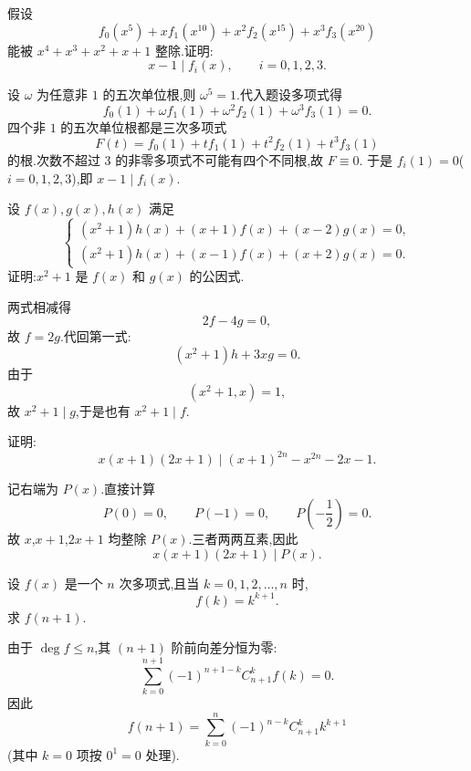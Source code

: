 \begin{example}
假设
\[
  f_0(x^5)+xf_1(x^{10})+x^2f_2(x^{15})+x^3f_3(x^{20})
\]
能被 $x^4+x^3+x^2+x+1$ 整除.证明:
\[
  x-1\mid f_i(x),
  \qquad i=0,1,2,3.
\]
\end{example}
\exampleblank

\begin{solution}
设 $\omega$ 为任意非 $1$ 的五次单位根,则 $\omega^5=1$.代入题设多项式得
\[
  f_0(1)+\omega f_1(1)+\omega^2f_2(1)+\omega^3f_3(1)=0.
\]
四个非 $1$ 的五次单位根都是三次多项式
\[
  F(t)=f_0(1)+t f_1(1)+t^2f_2(1)+t^3f_3(1)
\]
的根.次数不超过 $3$ 的非零多项式不可能有四个不同根,故 $F\equiv0$.
于是 $f_i(1)=0$($i=0,1,2,3$),即 $x-1\mid f_i(x)$.
\end{solution}

\begin{example}
设 $f(x),g(x),h(x)$ 满足
\[
\begin{cases}
  (x^2+1)h(x)+(x+1)f(x)+(x-2)g(x)=0,\\
  (x^2+1)h(x)+(x-1)f(x)+(x+2)g(x)=0.
\end{cases}
\]
证明:$x^2+1$ 是 $f(x)$ 和 $g(x)$ 的公因式.
\end{example}
\exampleblank

\begin{solution}
两式相减得
\[
  2f-4g=0,
\]
故 $f=2g$.代回第一式:
\[
  (x^2+1)h+3xg=0.
\]
由于
\[
  (x^2+1,x)=1,
\]
故 $x^2+1\mid g$,于是也有 $x^2+1\mid f$.
\end{solution}

\begin{example}
证明:
\[
  x(x+1)(2x+1)
  \mid
  (x+1)^{2n}-x^{2n}-2x-1.
\]
\end{example}
\exampleblank

\begin{solution}
记右端为 $P(x)$.直接计算
\[
  P(0)=0,
  \qquad
  P(-1)=0,
  \qquad
  P\left(-\dfrac12\right)=0.
\]
故 $x$,$x+1$,$2x+1$ 均整除 $P(x)$.三者两两互素,因此
\[
  x(x+1)(2x+1)\mid P(x).
\]
\end{solution}

\begin{example}
设 $f(x)$ 是一个 $n$ 次多项式,且当 $k=0,1,2,\ldots,n$ 时,
\[
  f(k)=k^{k+1}.
\]
求 $f(n+1)$.
\end{example}
\exampleblank

\begin{solution}
由于 $\deg f\le n$,其 $(n+1)$ 阶前向差分恒为零:
\[
  \displaystyle\sum\limits_{k=0}^{n+1}
  (-1)^{n+1-k}C_{n+1}^{k}f(k)=0.
\]
因此
\[
  \boxed{
  f(n+1)=
  \sum\limits_{k=0}^{n}
  (-1)^{n-k}C_{n+1}^{k}k^{k+1}}
\]
(其中 $k=0$ 项按 $0^{1}=0$ 处理).
\end{solution}

